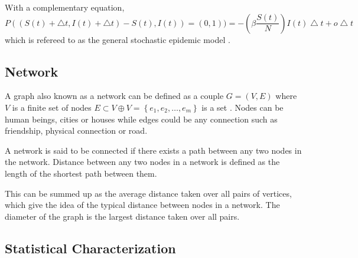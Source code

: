 With a complementary equation,
\begin{equation}
P((S(t) + \bigtriangleup t, I(t)+ \bigtriangleup t) - S(t), I(t)) =(0,1)) =  -\left( \beta \dfrac{ S(t)}{N}\right) I(t) \bigtriangleup t + o\bigtriangleup t
\end{equation}
which is refereed to as the general stochastic  epidemic model \citep{greenwood2009stochastic}.


\subsection{Network}


A graph also known as a network can be defined as a couple $G = (V, E) $ where $V$ is a finite set of nodes $E \subset V \oplus V = \left\lbrace e_1,e_2,\dots, e_m \right\rbrace$ is a set \citep{estrada2012structure}. Nodes can be human beings, cities or houses while edges could be any connection such as friendship, physical connection or road.

A network is said to be connected if there exists a path between any two nodes in the network. Distance between any two nodes in a network is defined as the length of the shortest path between them.

This can be summed up as the average distance taken over all pairs of vertices, which give the idea of the typical distance between nodes in a network. The diameter of the graph is the largest distance taken over all pairs.

\subsection{Statistical Characterization}
 
